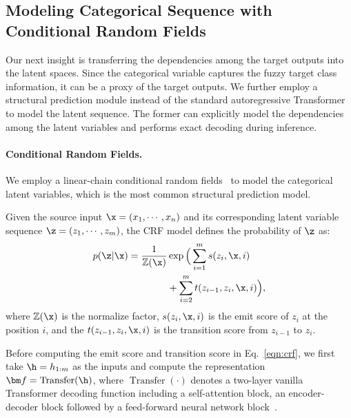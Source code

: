 \subsection{Modeling Categorical Sequence with Conditional Random Fields}\label{ss:crf}
Our next insight is transferring the dependencies among the target outputs into the latent spaces. 
Since the categorical variable captures the fuzzy target class information, it can be a proxy of the target outputs. 
We further employ a structural prediction module instead of the standard autoregressive Transformer to model the latent sequence. 
The former can explicitly model the dependencies among the latent variables and performs exact decoding during inference.

\paragraph{Conditional Random Fields.}
We employ a linear-chain conditional random fields~\cite[CRF,][]{crf} to model the categorical latent variables, which is the most common structural prediction model.

Given the source input $\x=(x_1,\cdots,x_n)$ and its corresponding latent variable sequence $\z=(z_1,\cdots,z_m)$, the CRF model defines the probability of $\z$ as:
\begin{equation}\begin{split}
    p(\z|\x)=\frac{1}{\mathbb{Z}(\x)}&\operatorname{exp}\Big(\sum_{i=1}^{m}s(z_i,\x,i) \\ 
    &+\sum_{i=2}^{m}t(z_{i-1},z_i,\x,i) \Big), 
    \label{eqn:crf}
\end{split}
\end{equation}
where $\mathbb{Z}(\x)$ is the normalize factor, $s(z_i,\x,i)$ is the emit score of $z_i$ at the position $i$, and the $t(z_{i-1},z_i,\x,i)$ is the transition score from $z_{i-1}$ to $z_i$. 

Before computing the emit score and transition score in Eq.~\ref{eqn:crf}, we first take $\h=h_{1:m}$ as the inputs and compute the representation $\bm f = \operatorname{Transfer}(\h)$, where $\operatorname{Transfer}(\cdot)$ denotes a two-layer vanilla Transformer decoding function including a self-attention block, an encoder-decoder block followed by a feed-forward neural network block~\cite{transformer}.

